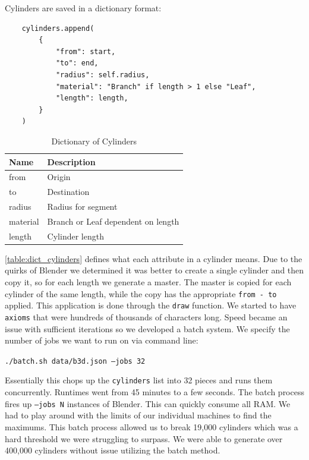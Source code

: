 Cylinders are saved in a dictionary format:
\begin{verbatim}
    cylinders.append(
        {
            "from": start,
            "to": end,
            "radius": self.radius,
            "material": "Branch" if length > 1 else "Leaf",
            "length": length,
        }
    )
\end{verbatim}

\begin{table}[H]
    \centering
    \caption{Dictionary of Cylinders}\label{table:dict_cylinders}
    \begin{tabular}{@{}ll@{}}
        \toprule
        \textbf{Name} & \textbf{Description}               \\ \midrule
        from          & Origin                             \\
        to            & Destination                        \\
        radius        & Radius for segment                 \\
        material      & Branch or Leaf dependent on length \\
        length        & Cylinder length                    \\ \bottomrule
    \end{tabular}
\end{table}

\autoref{table:dict_cylinders} defines what each attribute in a cylinder
means. Due to the quirks of Blender we determined it was better to create a
single cylinder and then copy it, so for each length we generate a master. The
master is copied for each cylinder of the same length, while the copy has the
appropriate \texttt{from - to} applied. This application is done through the
\texttt{draw} function. We started to have \texttt{axioms} that
were hundreds of thousands of characters long. Speed became an issue with
sufficient iterations so we developed a batch system.  We specify the number of
jobs we want to run on via command line:

\texttt{./batch.sh data/b3d.json --jobs 32}

Essentially this chops up the \texttt{cylinders} list into 32 pieces and runs
them concurrently. Runtimes went from 45 minutes to a few seconds. The
batch process fires up \texttt{--jobs N} instances of Blender. This can
quickly consume all RAM. We had to play around with the limits of our
individual machines to find the maximums. This batch process allowed us to
break 19,000 cylinders which was a hard threshold we were struggling to surpass.
We were able to generate over 400,000 cylinders without issue utilizing the
batch method.

